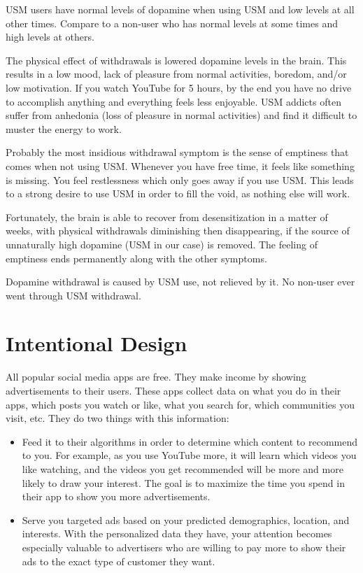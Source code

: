 \documentclass[
  openany]{book}
\providecommand{\tightlist}{%
  \setlength{\itemsep}{0pt}\setlength{\parskip}{0pt}}
\newenvironment{rmdnote}{
\color{blue}
\begin{framed}}{\end{framed}}
\begin{document}
\begin{rmdnote}
USM users have normal levels of dopamine when using USM and low levels at all other times. Compare to a non-user who has normal levels at some times and high levels at others.

\end{rmdnote}

The physical effect of withdrawals is lowered dopamine levels in the brain. This results in a low mood, lack of pleasure from normal activities, boredom, and/or low motivation. If you watch YouTube for 5 hours, by the end you have no drive to accomplish anything and everything feels less enjoyable. USM addicts often suffer from anhedonia (loss of pleasure in normal activities) and find it difficult to muster the energy to work.

Probably the most insidious withdrawal symptom is the sense of emptiness that comes when not using USM. Whenever you have free time, it feels like something is missing. You feel restlessness which only goes away if you use USM. This leads to a strong desire to use USM in order to fill the void, as nothing else will work.

Fortunately, the brain is able to recover from desensitization in a matter of weeks, with physical withdrawals diminishing then disappearing, if the source of unnaturally high dopamine (USM in our case) is removed. The feeling of emptiness ends permanently along with the other symptoms.

\begin{rmdnote}
Dopamine withdrawal is caused by USM use, not relieved by it. No non-user ever went through USM withdrawal.

\end{rmdnote}

\section{Intentional Design}\label{intentional-design}

All popular social media apps are free. They make income by showing advertisements to their users. These apps collect data on what you do in their apps, which posts you watch or like, what you search for, which communities you visit, etc. They do two things with this information:

\begin{itemize}
\tightlist
\item
  Feed it to their algorithms in order to determine which content to recommend to you. For example, as you use YouTube more, it will learn which videos you like watching, and the videos you get recommended will be more and more likely to draw your interest. The goal is to maximize the time you spend in their app to show you more advertisements.
\item
  Serve you targeted ads based on your predicted demographics, location, and interests. With the personalized data they have, your attention becomes especially valuable to advertisers who are willing to pay more to show their ads to the exact type of customer they want.
\end{itemize}
\end{document}
